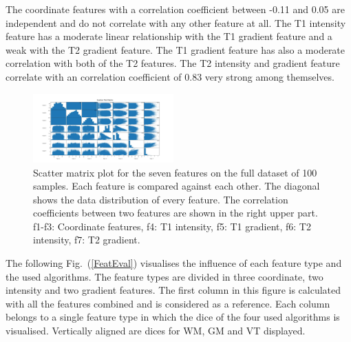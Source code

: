 \documentclass[journal]{IEEEtran}
\begin{document}
The coordinate features with a correlation coefficient between -0.11 and 0.05 are independent and do not correlate with any other feature at all. The T1 intensity feature has a moderate linear relationship with the T1 gradient feature and a weak with the T2 gradient feature. The T1 gradient feature has also a moderate correlation with both of the T2 features. The T2 intensity and gradient feature correlate with an correlation coefficient of 0.83 very strong among themselves.

\begin{figure}[h]
	\centering
	\includegraphics[width=0.48\textwidth]{images/ScatterPlotMatrix}
	\caption{Scatter matrix plot for the seven features on the full dataset of 100 samples. Each feature is compared against each other. The diagonal shows the data distribution of every feature. The correlation coefficients between two features are shown in the right upper part. f1-f3: Coordinate features, f4: T1 intensity, f5: T1 gradient, f6: T2 intensity, f7: T2 gradient.}
	\label{scatterplot}
\end{figure}

The following Fig.~(\ref{FeatEval}) visualises the influence of each feature type and the used algorithms. The feature types are divided in three coordinate, two intensity and two gradient features. The first column in this figure is calculated with all the features combined and is considered as a reference. Each column belongs to a single feature type in which the dice of the four used algorithms is visualised. Vertically aligned are dices for WM, GM and VT displayed.
\end{document}
